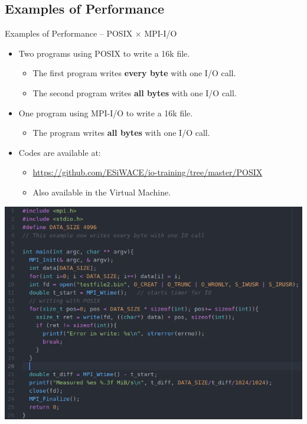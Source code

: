 \documentclass[compress,11pt,xcolor=svgnames,aspectratio=169]{beamer}
\begin{document}
\subsection{Examples of Performance}

\begin{frame}[fragile]{Examples of Performance -- POSIX $\times$ MPI-I/O}

\begin{itemize}
\setlength\itemsep{0.5cm}

\item Two programs using POSIX to write a 16k file.

  \begin{itemize}
    \item The first program writes \textbf{every byte} with one I/O call.
    \item The second program writes \textbf{all bytes} with one I/O call.
  \end{itemize}

\item One program using MPI-I/O to write a 16k file.

  \begin{itemize}
    \item The program writes \textbf{all bytes} with one I/O call.
  \end{itemize}

\item Codes are available at:

  \begin{itemize}
    \item \url{https://github.com/ESiWACE/io-training/tree/master/POSIX}
    \item Also available in the Virtual Machine.
  \end{itemize}

\end{itemize}

\end{frame}

\begin{frame}[fragile]{}

\begin{center}
\includegraphics[scale=0.6]{fig/prog-posix1}
\end{center}

\end{frame}
\end{document}
